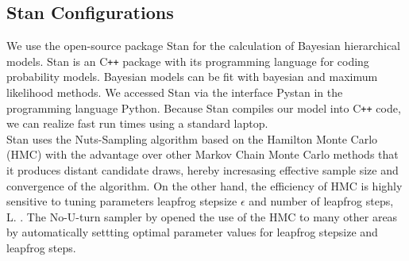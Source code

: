 \subsection{Stan Configurations}
We use the open-source package Stan for the calculation of  Bayesian hierarchical models. Stan is an C\texttt{++} package with its programming language for coding probability models.  Bayesian models can be fit with bayesian and maximum likelihood methods. We accessed Stan via the interface Pystan in the programming language Python. Because Stan compiles our model into C\texttt{++} code, we can realize fast run times using a standard laptop.\\
Stan uses the Nuts-Sampling algorithm based on the Hamilton Monte Carlo (HMC) with the advantage  over other Markov Chain Monte Carlo methods that it produces distant candidate draws, hereby incresasing effective sample size and convergence of the algorithm.
On the other hand, the efficiency of HMC is highly sensitive to tuning parameters leapfrog stepsize $\epsilon$ and number of leapfrog steps, L. \cite{neal2011}. %
The No-U-turn sampler by \cite{hoffman2014} opened the use of the HMC to many other areas by automatically settting optimal parameter values for leapfrog stepsize and leapfrog steps. \\
